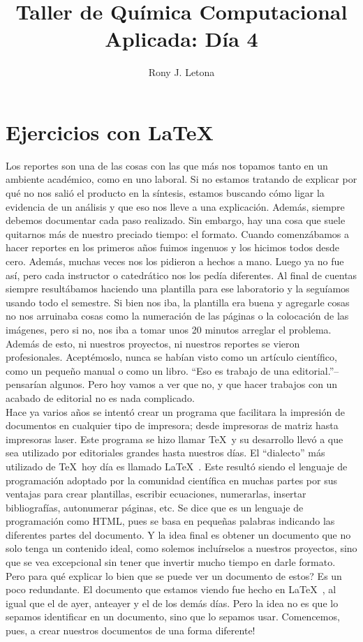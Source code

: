 \documentclass[10pt,letterpaper]{article}
\author{Rony J. Letona}
\title{Taller de Qu\'imica Computacional Aplicada: D\'ia 4}
\begin{document}
\maketitle

\section{Ejercicios con \LaTeX\ }
Los reportes son una de las cosas con las que m\'as nos topamos tanto en un ambiente acad\'emico, como en uno laboral. Si no estamos tratando de explicar por qu\'e no nos sali\'o el producto en la s\'intesis, estamos buscando c\'omo ligar la evidencia de un an\'alisis y que eso nos lleve a una explicaci\'on. Adem\'as, siempre debemos documentar cada paso realizado. Sin embargo, hay una cosa que suele quitarnos m\'as de nuestro preciado tiempo: el formato. Cuando comenz\'abamos a hacer reportes en los primeros a\~nos fuimos ingenuos y los hicimos todos desde cero. Adem\'as, muchas veces nos los pidieron a hechos a mano. Luego ya no fue as\'i, pero cada instructor o catedr\'atico nos los ped\'ia diferentes. Al final de cuentas siempre result\'abamos haciendo una plantilla para ese laboratorio y la segu\'iamos usando todo el semestre. Si bien nos iba, la plantilla era buena y agregarle cosas no nos arruinaba cosas como la numeraci\'on de las p\'aginas o la colocaci\'on de las im\'agenes, pero si no, nos iba a tomar unos 20 minutos arreglar el problema. Adem\'as de esto, ni nuestros proyectos, ni nuestros reportes se vieron profesionales. Acept\'emoslo, nunca se hab\'ian visto como un art\'iculo cient\'ifico, como un peque\~no manual o como un libro. ``Eso es trabajo de una editorial.''--pensar\'ian algunos. Pero hoy vamos a ver que no, y que hacer trabajos con un acabado de editorial no es nada complicado.\\

Hace ya varios a\~nos se intent\'o crear un programa que facilitara la impresi\'on de documentos en cualquier tipo de impresora; desde impresoras de matriz hasta impresoras laser. Este programa se hizo llamar \TeX\ y su desarrollo llev\'o a que sea utilizado por editoriales grandes hasta nuestros d\'ias. El ``dialecto'' m\'as utilizado de \TeX\ hoy d\'ia es llamado \LaTeX\ . Este result\'o siendo el lenguaje de programaci\'on adoptado por la comunidad cient\'ifica en muchas partes por sus ventajas para crear plantillas, escribir ecuaciones, numerarlas, insertar bibliograf\'ias, autonumerar p\'aginas, etc. Se dice que es un lenguaje de programaci\'on como HTML, pues se basa en peque\~nas palabras indicando las diferentes partes del documento. Y la idea final es obtener un documento que no solo tenga un contenido ideal, como solemos inclu\'irselos a nuestros proyectos, sino que se vea excepcional sin tener que invertir mucho tiempo en darle formato. Pero para qu\'e explicar lo bien que se puede ver un documento de estos? Es un poco redundante. El documento que estamos viendo fue hecho en \LaTeX\ , al igual que el de ayer, anteayer y el de los dem\'as d\'ias. Pero la idea no es que lo sepamos identificar en un documento, sino que lo sepamos usar. Comencemos, pues, a crear nuestros documentos de una forma diferente!
\end{document}
